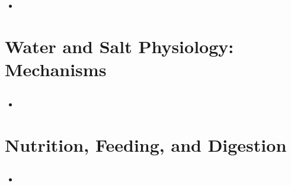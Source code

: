 \documentclass[12pt,a4paper]{article}
\begin{document}
\subsection{}
\begin{itemize}
    \item 
\end{itemize}

\clearpage
\setcounter{section}{26}
\section{Water and Salt Physiology: Mechanisms}
\subsection{}
\begin{itemize}
    \item 
\end{itemize}

\clearpage
\setcounter{section}{6}
\section{Nutrition, Feeding, and Digestion}
\subsection{}
\begin{itemize}
    \item 
\end{itemize}

\clearpage
{}

\end{document}
